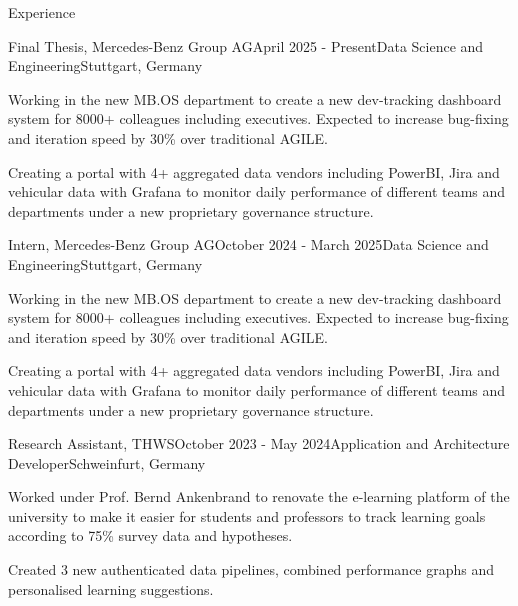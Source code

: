 \documentclass[
	a4paper, %
    10pt, %
]{resume} %
\begin{document}
\begin{rSection}{Experience}

	\begin{rSubsection}{Final Thesis, Mercedes-Benz Group AG}{April 2025 - Present}{Data Science and Engineering}{Stuttgart, Germany}
		\item Working in the new MB.OS department to create a new dev-tracking dashboard system for 8000+ colleagues including executives. Expected to increase bug-fixing and iteration speed by 30\% over traditional AGILE.
		\item Creating a portal with 4+ aggregated data vendors including PowerBI, Jira and vehicular data with Grafana to monitor daily performance of different teams and departments under a new proprietary governance structure.
	\end{rSubsection}


	\begin{rSubsection}{Intern, Mercedes-Benz Group AG}{October 2024 - March 2025}{Data Science and Engineering}{Stuttgart, Germany}
		\item Working in the new MB.OS department to create a new dev-tracking dashboard system for 8000+ colleagues including executives. Expected to increase bug-fixing and iteration speed by 30\% over traditional AGILE.
		\item Creating a portal with 4+ aggregated data vendors including PowerBI, Jira and vehicular data with Grafana to monitor daily performance of different teams and departments under a new proprietary governance structure.
	\end{rSubsection}


	\begin{rSubsection}{Research Assistant, THWS}{October 2023 - May 2024}{Application and Architecture Developer}{Schweinfurt, Germany}
		\item Worked under Prof. Bernd Ankenbrand to renovate the e-learning platform of the university to make it easier for students and professors to track learning goals according to 75\% survey data and hypotheses.
		\item Created 3 new authenticated data pipelines, combined performance graphs and personalised learning suggestions.
	\end{rSubsection}



\end{rSection}
\end{document}
